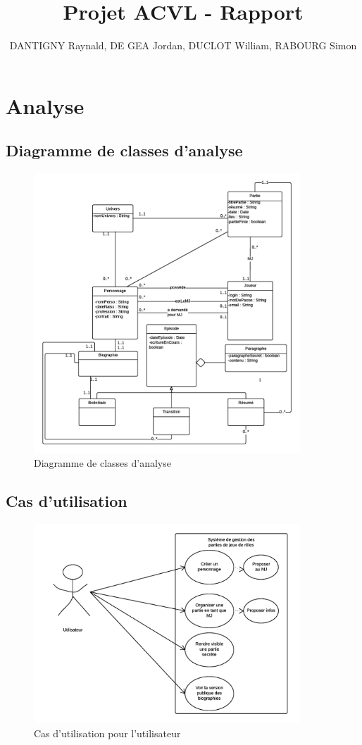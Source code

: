 \documentclass[a4paper,oneside,10pt]{article}
\title{Projet ACVL - Rapport}
\author{DANTIGNY Raynald, DE GEA Jordan, DUCLOT William, RABOURG Simon}
\begin{document}
\maketitle

\section{Analyse}
\subsection{Diagramme de classes d'analyse}
\begin{figure}[H]
\begin{center}
\includegraphics[width=10cm]{images/classe/DiagrammeClasse.png} 
	\caption{Diagramme de classes d'analyse}
\end{center}
\end{figure}
\subsection{Cas d'utilisation}
\begin{figure}[H]
	\begin{center}
\includegraphics[width=10cm]{images/utilisation/UserCU.png} 
	\caption{Cas d'utilisation pour l'utilisateur}
\end{center}
\end{figure}
\end{document}

